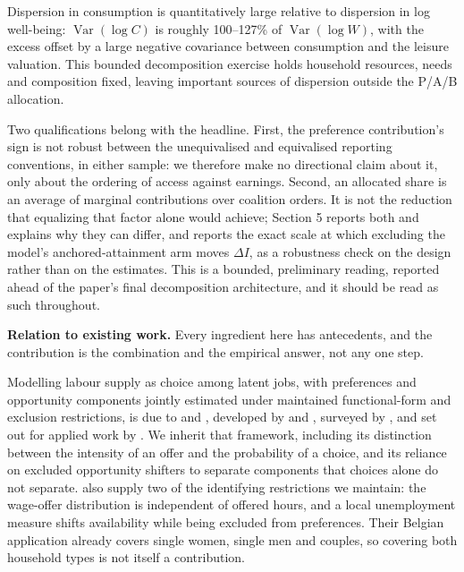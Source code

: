 \documentclass[11pt,a4paper]{article}
\begin{document}
Dispersion in consumption is quantitatively large relative to dispersion in log well-being: \(\operatorname{Var}(\log C)\) is roughly 100--127\% of \(\operatorname{Var}(\log W)\), with the excess offset by a large negative covariance between consumption and the leisure valuation. This bounded decomposition exercise holds household resources, needs and composition fixed, leaving important sources of dispersion outside the P/A/B allocation.

Two qualifications belong with the headline. First, the preference contribution's sign is not robust between the unequivalised and equivalised reporting conventions, in either sample: we therefore make no directional claim about it, only about the ordering of access against earnings. Second, an allocated share is an average of marginal contributions over coalition orders. It is not the reduction that equalizing that factor alone would achieve; Section 5 reports both and explains why they can differ, and reports the exact scale at which excluding the model's anchored-attainment arm moves \(\Delta I\), as a robustness check on the design rather than on the estimates. This is a bounded, preliminary reading, reported ahead of the paper's final decomposition architecture, and it should be read as such throughout.

\textbf{Relation to existing work.} Every ingredient here has antecedents, and the contribution is the combination and the empirical answer, not any one step.

Modelling labour supply as choice among latent jobs, with preferences and opportunity components jointly estimated under maintained functional-form and exclusion restrictions, is due to \citet{aaberge1995} and \citet{aaberge1999}, developed by \citet{dagsvikstrom2006} and \citet{dagsvikjia2016}, surveyed by \citet{aaberge2018}, and set out for applied work by \citet{capeau2016}. We inherit that framework, including its distinction between the intensity of an offer and the probability of a choice, and its reliance on excluded opportunity shifters to separate components that choices alone do not separate. \citet{capeau2016} also supply two of the identifying restrictions we maintain: the wage-offer distribution is independent of offered hours, and a local unemployment measure shifts availability while being excluded from preferences. Their Belgian application already covers single women, single men and couples, so covering both household types is not itself a contribution.
\end{document}

